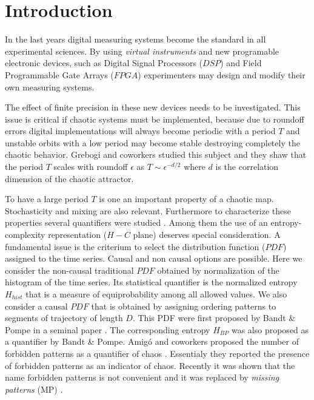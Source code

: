 \section{Introduction} \label{sec:intro}
In the last years digital measuring systems become the standard in all experimental sciences. By using \textit{virtual instruments} and new programable electronic
devices, such as Digital Signal Processors ($DSP$) and Field
Programmable Gate Arrays ($FPGA$)  experimenters may design and
modify their own measuring systems.

The effect of finite precision in these new devices needs to be
investigated. This issue is critical if  chaotic systems must be implemented, because due to roundoff errors digital implementations will always become periodic with a period $T$ and unstable orbits with a low period may become stable destroying completely the chaotic behavior.  
Grebogi and coworkers \cite{Grebogi1988} studied this subject and they shaw that the period $T$ scales with roundoff $\epsilon$ as
$T\sim\epsilon^{-d/2}$ where $d$ is the correlation dimension of
the chaotic attractor. 

To have a large period $T$ is one an important property of a chaotic map. Stochasticity and mixing are also relevant. Furthermore to characterize these properties several quantifiers were
studied  \cite{DeMicco2009}. Among them the use of an
entropy-complexity representation ($H-C$ plane) deserves special
consideration\cite{Rosso2007C,DeMicco2008,DeMicco2011,DeMicco2009,Rosso2009}. 
A fundamental issue is the criterium to select the distribution function ($PDF$) assigned to the time series. Causal and non causal options are possible. Here we consider the non-causal traditional $PDF$ obtained by normalization of the histogram of the time series. Its statistical quantifier is the normalized entropy$H_{hist}$ that is  a measure of equiprobability among all allowed values. We also consider a causal $PDF$  that is obtained by assigning ordering patterns to segments of trajectory of length $D$. This PDF were first proposed by Bandt \& Pompe in a seminal paper \cite{Pompe2002}. The corresponding entropy $H_{BP}$ was also proposed as a quantifier by Bandt \& Pompe. Amig\'o and coworkers proposed the number of forbidden patterns as a quantifier of chaos \cite{Amigo2007b}. Essentialy they reported the presence of forbidden patterns as an indicator of chaos. Recently it was shown that the name forbidden patterns is not convenient and it was replaced by  \textit{missing patterns }(MP) \cite{Rosso2012b}. 

